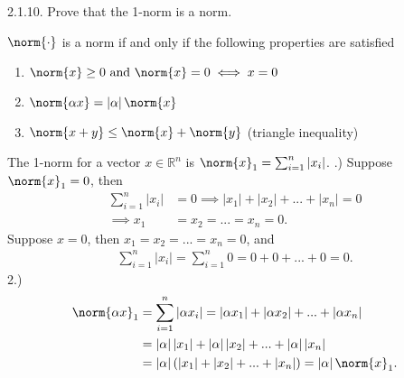 \documentclass{report}
\begin{document}
    \bigbreak \noindent 
    \begin{mdframed}
        2.1.10. Prove that the 1-norm is a norm. 
    \end{mdframed}
    \bigbreak \noindent 
    \begin{remark}
        $\norm{\cdot}$ is a norm if and only if the following properties are satisfied
        \begin{enumerate}
            \item $\norm{x} \geq 0 \text{ and } \norm{x} = 0 \iff x= 0 $ 
            \item $ \norm{\alpha x} = \left\lvert \alpha \right\rvert \norm{x}$
            \item $\norm{x+y} \leq \norm{x} + \norm{y} $ (triangle inequality)
        \end{enumerate}
    \end{remark}
    \bigbreak \noindent 
    The 1-norm for a vector $x \in \mathbb{R}^{n}$ is $\norm{x}_{1} = \sum_{i=1}^{n}\left\lvert x_{i} \right\rvert $.
    \bigbreak {}.) Suppose $\norm{x}_1 = 0$, then
    \begin{align*}
        \sum_{i=1}^{n}\left\lvert x_{i} \right\rvert &= 0 \implies \left\lvert x_{1} \right\rvert + \left\lvert x_{2} \right\rvert + ... + \left\lvert x_{n} \right\rvert = 0 \\
        \implies x_{1} &= x_{2} = ... = x_{n} = 0
    .\end{align*}
    Suppose $x=0$, then $x_{1} = x_{2} = ... = x_{n}= 0$, and
    \begin{align*}
        \sum_{i=1}^{n} \left\lvert x_{i} \right\rvert = \sum_{i=1}^{n} 0 = 0 + 0 + ... + 0  = 0
    .\end{align*}
    2.) 
    \begin{align*}
        \norm{\alpha x}_1 &= \sum_{i=1}^{n}\left\lvert \alpha x_{i} \right\rvert = \left\lvert \alpha x_{1} \right\rvert + \left\lvert \alpha x_{2} \right\rvert + ... + \left\lvert \alpha x_{n} \right\rvert \\
                        &= \left\lvert \alpha \right\rvert \left\lvert x_{1} \right\rvert + \left\lvert \alpha \right\rvert \left\lvert x_{2} \right\rvert + ... + \left\lvert \alpha \right\rvert \left\lvert x_{n} \right\rvert \\
                        &= \left\lvert \alpha \right\rvert \left(\left\lvert x_{1} \right\rvert + \left\lvert x_{2} \right\rvert + ... + \left\lvert x_{n} \right\rvert\right) = \left\lvert \alpha \right\rvert \norm{x}_1
    .\end{align*}
\end{document}
